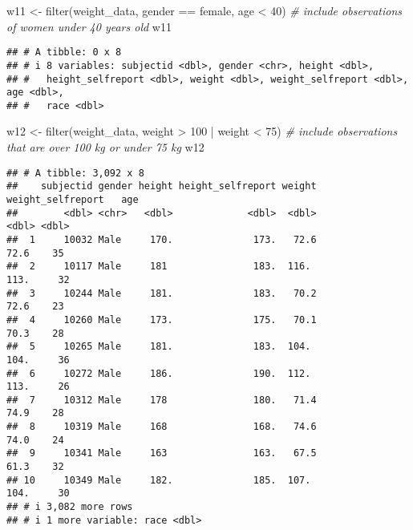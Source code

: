 \documentclass[
]{article}
\newenvironment{Shaded}{\begin{snugshade}}{\end{snugshade}}
\newcommand{\CommentTok}[1]{\textcolor[rgb]{0.56,0.35,0.01}{\textit{#1}}}
\newcommand{\DecValTok}[1]{\textcolor[rgb]{0.00,0.00,0.81}{#1}}
\newcommand{\FunctionTok}[1]{\textcolor[rgb]{0.00,0.00,0.00}{#1}}
\newcommand{\NormalTok}[1]{#1}
\newcommand{\OtherTok}[1]{\textcolor[rgb]{0.56,0.35,0.01}{#1}}
\newcommand{\SpecialCharTok}[1]{\textcolor[rgb]{0.00,0.00,0.00}{#1}}
\newcommand{\StringTok}[1]{\textcolor[rgb]{0.31,0.60,0.02}{#1}}
\begin{document}
\begin{Shaded}
\begin{Highlighting}[]
\NormalTok{w11 }\OtherTok{\textless{}{-}} \FunctionTok{filter}\NormalTok{(weight\_data, gender }\SpecialCharTok{==} \StringTok{\textquotesingle{}female\textquotesingle{}}\NormalTok{, age }\SpecialCharTok{\textless{}} \DecValTok{40}\NormalTok{) }\CommentTok{\# include observations of women under 40 years old}
\NormalTok{w11}
\end{Highlighting}
\end{Shaded}

\begin{verbatim}
## # A tibble: 0 x 8
## # i 8 variables: subjectid <dbl>, gender <chr>, height <dbl>,
## #   height_selfreport <dbl>, weight <dbl>, weight_selfreport <dbl>, age <dbl>,
## #   race <dbl>
\end{verbatim}

\begin{Shaded}
\begin{Highlighting}[]
\NormalTok{w12 }\OtherTok{\textless{}{-}} \FunctionTok{filter}\NormalTok{(weight\_data, weight }\SpecialCharTok{\textgreater{}} \DecValTok{100} \SpecialCharTok{|}\NormalTok{ weight }\SpecialCharTok{\textless{}} \DecValTok{75}\NormalTok{) }\CommentTok{\# include observations that are over 100 kg or under 75 kg}
\NormalTok{w12}
\end{Highlighting}
\end{Shaded}

\begin{verbatim}
## # A tibble: 3,092 x 8
##    subjectid gender height height_selfreport weight weight_selfreport   age
##        <dbl> <chr>   <dbl>             <dbl>  <dbl>             <dbl> <dbl>
##  1     10032 Male     170.              173.   72.6              72.6    35
##  2     10117 Male     181               183.  116.              113.     32
##  3     10244 Male     181.              183.   70.2              72.6    23
##  4     10260 Male     173.              175.   70.1              70.3    28
##  5     10265 Male     181.              183.  104.              104.     36
##  6     10272 Male     186.              190.  112.              113.     26
##  7     10312 Male     178               180.   71.4              74.9    28
##  8     10319 Male     168               168.   74.6              74.0    24
##  9     10341 Male     163               163.   67.5              61.3    32
## 10     10349 Male     182.              185.  107.              104.     30
## # i 3,082 more rows
## # i 1 more variable: race <dbl>
\end{verbatim}
\end{document}
